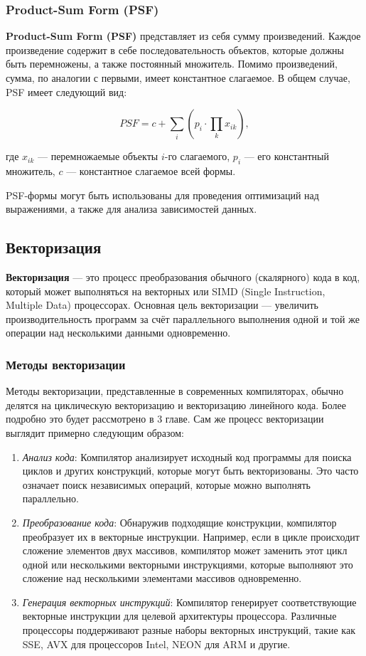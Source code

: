 \subsubsection{Product-Sum Form (PSF)}

\textbf{Product-Sum Form (PSF)} представляет из себя сумму произведений. Каждое произведение содер­жит в себе последовательность объектов, которые должны быть перемножены, а также постоянный множитель. Помимо произведений, сумма, по аналогии с первыми, имеет константное слагаемое.
В общем случае, PSF имеет следующий вид:

\begin{equation}
    PSF = c +\sum_{i}(p_i\cdot \prod_{k}x_{ik}),
\end{equation}

где $x_{ik}$ — перемножаемые объекты $i$-го слагаемого, $p_i$ — его константный множи­тель, $c$ — константное слагаемое всей формы.

PSF-формы могут быть использованы для проведения оптимизаций над выражениями, а также для анализа зависимостей данных.


\subsection{Векторизация}

\textbf{Векторизация} — это процесс преобразования обычного (скалярного) кода в код, который может выполняться на векторных или SIMD (Single Instruction, Multiple Data) процессорах. Основная цель векторизации — увеличить производительность программ за счёт параллельного выполнения одной и той же операции над несколькими данными одновременно.

\subsubsection{Методы векторизации}
Методы векторизации, представленные в современных компиляторах, обычно делятся на циклическую векторизацию и векторизацию линейного кода. Более подробно это будет рассмотрено в 3 главе. Сам же процесс векторизации выглядит примерно следующим образом:

\begin{enumerate}
    \item \textit{Анализ кода}: Компилятор анализирует исходный код программы для поиска циклов и других конструкций, которые могут быть векторизованы. Это часто означает поиск независимых операций, которые можно выполнять параллельно.
    \item \textit{Преобразование кода}: Обнаружив подходящие конструкции, компилятор преобразует их в векторные инструкции. Например, если в цикле происходит сложение элементов двух массивов, компилятор может заменить этот цикл одной или несколькими векторными инструкциями, которые выполняют это сложение над несколькими элементами массивов одновременно.
    \item \textit{Генерация векторных инструкций}: Компилятор генерирует соответствующие векторные инструкции для целевой архитектуры процессора. Различные процессоры поддерживают разные наборы векторных инструкций, такие как SSE, AVX для процессоров Intel, NEON для ARM и другие.
\end{enumerate}

